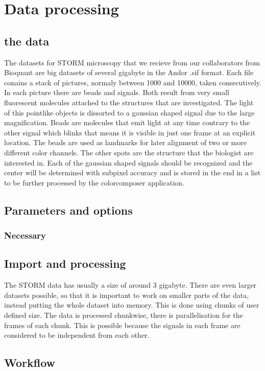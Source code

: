 \chapter{Data processing}

\section{the data}
The datasets for STORM microscopy that we recieve from our collaborators from
Bioquant are big datasets of several gigabyte in the Andor .sif format. Each
file conains a stack of pictures, normaly between 1000 and 10000, taken
consecutively.
In each picture there are beads and signals. Both result from very small 
fluorescent molecules attached to the structures that are investigated. The
light of this pointlike objects is dissorted to a gaussian shaped signal due to
the large magnification.
Beads are molecules that emit light at any time contrary to the other signal
which blinks that means it is visible in just one frame at an explicit location.
The beads are used as landmarks for later alignment of two or more different
color channels. The other spots are the structure that the biologist are
interested in. Each of the gaussian shaped signals should be recognized and the
center will be determined with subpixel accuracy and is stored in the end in a
list to be further processed by the colorcomposer application.

\section{Parameters and options}
\subsection{Necessary}

\section{Import and processing}
The STORM data has usually a size of around 3 gigabyte. There are even larger datasets possible, so that it is important to work on smaller parts of the data, instead putting the whole dataset into memory. This is done using chunks of user defined size. The data is processed chunkwise, there is parallelisation for the frames of each chunk. This is possible because the signals in each frame are considered to be independent from each other.  

\section{Workflow}
